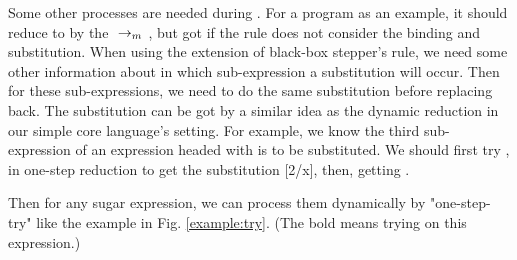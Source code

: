Some other processes are needed during . For a program  as an example, it should reduce to  by the $~\rightarrow_m~$, but got  if the  rule does not consider the binding and substitution. When using the extension of black-box stepper's rule, we need some other information about in which sub-expression a substitution will occur. Then for these sub-expressions, we need to do the same substitution before replacing back. The substitution can be got by a similar idea as the dynamic reduction in our simple core language's setting. For example, we know the third sub-expression of an expression headed with  is to be substituted. We should first try ,  in one-step reduction to get the substitution [2/x], then, getting .

Then for any sugar expression, we can process them dynamically by "one-step-try" like the example in Fig.  \ref{example:try}. (The bold  means trying on this expression.)

